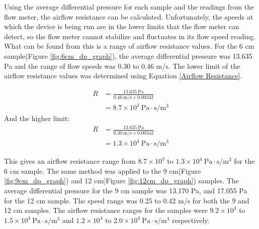 	Using the average differential pressure for each sample and the readings from the 
flow meter, the airflow resistance can be calculated. Unfortunately, the speeds at which the 
device is being run are in the lower limits that the flow meter can detect, so the flow meter 
cannot stabilize and fluctuates in its flow speed reading. What can be found from this is a 
range of airflow resistance values. For the 6 cm sample(Figure \ref{fig:6cm_dp_graph}), the 
average differential pressure was 13.635 Pa and the range of flow speeds was 0.30 to 0.46 
m/s. The lower limit of the airflow resistance values was determined using Equation 
\ref{Airflow Resistance}. 

\begin{align}
R &= \frac{13.635\ \mathrm{Pa}}{0.46\ \mathrm{m/s} \times 0.00342} \\
  &= 8.7 \times 10^3\ \mathrm{Pa\cdot s/m^3}
\end{align}
And the higher limit:
\begin{align}
R &= \frac{13.635\ \mathrm{Pa}}{0.30\ \mathrm{m/s} \times 0.00342} \\
  &= 1.3 \times 10^4\ \mathrm{Pa\cdot s/m^3}
\end{align}

This gives an airflow resistance range from $8.7 \times 10^3$ to $1.3 \times 10^4\ 
\mathrm{Pa\cdot s/m^3}$ for the 6 cm sample.
	The same method was applied to the 9 cm(Figure \ref{fig:9cm_dp_graph}) and 12 
cm(Figure \ref{fig:12cm_dp_graph}) samples. The average differential pressure for the 9 cm 
sample was 13.170 Pa, and 17.055 Pa for the 12 cm sample. The speed range was 0.25 to 
0.42 m/s for both the 9 and 12 cm samples. The airflow resistance ranges for the samples 
were $9.2 \times 10^3$ to $1.5 \times 10^4\ \mathrm{Pa\cdot s/m^3}$ and $1.2 \times 10^4$ 
to $2.0 \times 10^4\ \mathrm{Pa\cdot s/m^3}$ respectively.

 
